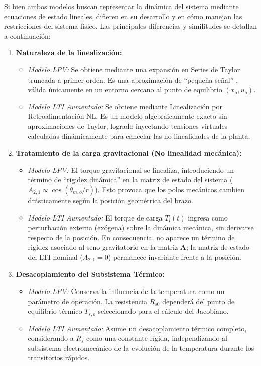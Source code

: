 \documentclass[12pt, a4paper,journal, onecolumn, compsoc]{IEEEtran}
\begin{document}
Si bien ambos modelos buscan representar la dinámica del sistema mediante ecuaciones de estado lineales, difieren en su desarrollo y en cómo manejan las restricciones del sistema físico. Las principales diferencias y similitudes se detallan a continuación:

\begin{enumerate}
    \item \textbf{Naturaleza de la linealización:}
    \begin{itemize}
        \item \textit{Modelo LPV:} Se obtiene mediante una expansión en Series de Taylor truncada a primer orden. Es una aproximación de ``pequeña señal'' \cite{franklin_feedback}, válida únicamente en un entorno cercano al punto de equilibrio $(x_o, u_o)$.
        \item \textit{Modelo LTI Aumentado:} Se obtiene mediante Linealización por Retroalimentación NL. Es un modelo algebraicamente exacto sin aproximaciones de Taylor, logrado inyectando tensiones virtuales calculadas dinámicamente para cancelar las no linealidades de la planta.
    \end{itemize}
    
    \item \textbf{Tratamiento de la carga gravitacional (No linealidad mecánica):}
    \begin{itemize}
        \item \textit{Modelo LPV:} El torque gravitacional se linealiza, introduciendo un término de ``rigidez dinámica'' en la matriz de estado del sistema ($A_{2,1} \propto \cos(\theta_{m,o}/r)$). Esto provoca que los polos mecánicos cambien drásticamente según la posición geométrica del brazo.
        \item \textit{Modelo LTI Aumentado:} El torque de carga $T_l(t)$ ingresa como perturbación externa (exógena) sobre la dinámica mecánica, sin derivarse respecto de la posición. En consecuencia, no aparece un término de rigidez asociado al seno gravitatorio en la matriz $\bm{A}$; la matriz de estado del LTI nominal ($A_{2,1}=0$) permanece invariante frente a la posición.
    \end{itemize}

    \item \textbf{Desacoplamiento del Subsistema Térmico:}
    \begin{itemize}
        \item \textit{Modelo LPV:} Conserva la influencia de la temperatura como un parámetro de operación. La resistencia $R_{s0}$ dependerá del punto de equilibrio térmico $T_{s,o}^\circ$ seleccionado para el cálculo del Jacobiano.
        \item \textit{Modelo LTI Aumentado:} Asume un desacoplamiento térmico completo, considerando a $R_s$ como una constante rígida, independizando al subsistema electromecánico de la evolución de la temperatura durante los transitorios rápidos.
    \end{itemize}


\end{enumerate}
\end{document}
